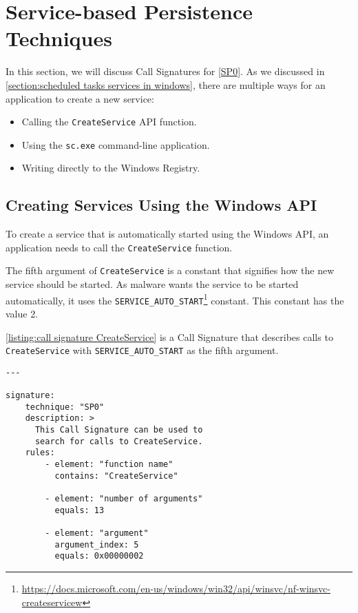 \section{Service-based Persistence Techniques}\label{section:call signatures sp}
In this section, we will discuss Call Signatures for \autoref{SP0}. As we discussed in \autoref{section:scheduled tasks services in windows}, there are multiple ways for an application to create a new service:

\begin{itemize}
    \item Calling the \texttt{CreateService} API function.
    \item Using the \texttt{sc.exe} command-line application.
    \item Writing directly to the Windows Registry.
\end{itemize}

\subsection{Creating Services Using the Windows API}
To create a service that is automatically started using the Windows API, an application needs to call the \texttt{CreateService} function.

The fifth argument of \texttt{CreateService} is a constant that signifies how the new service should be started. As malware wants the service to be started automatically, it uses the \texttt{SERVICE\_AUTO\_START}\footnote{\tiny \url{https://docs.microsoft.com/en-us/windows/win32/api/winsvc/nf-winsvc-createservicew}} constant. This constant has the value 2.

\autoref{listing:call signature CreateService} is a Call Signature that describes calls to \texttt{CreateService} with \texttt{SERVICE\_AUTO\_START} as the fifth argument.

\begin{lstlisting}[label={listing:call signature CreateService}, caption={A Call Signature that matches a call to \texttt{CreateService}.}, captionpos=b]
---

signature:
    technique: "SP0"
    description: >
      This Call Signature can be used to
      search for calls to CreateService.
    rules:
        - element: "function name"
          contains: "CreateService"

        - element: "number of arguments"
          equals: 13

        - element: "argument"
          argument_index: 5
          equals: 0x00000002
\end{lstlisting}

